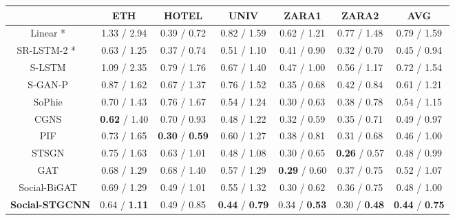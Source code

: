 \documentclass[10pt,twocolumn,letterpaper]{article}
\newcommand*{\ours}{Social-STGCNN }
\begin{document}
\begin{table*}[ht]
\centering
\begin{tabular}{c||c|c|c|c|c|c}
&  ETH & HOTEL & UNIV & ZARA1 & ZARA2 & AVG\\\hline
\midrule
Linear *~\cite{alahi2016social}  & 1.33 / 2.94 & 0.39 / 0.72 & 0.82 / 1.59 & 0.62 / 1.21 & 0.77 / 1.48 & 0.79 / 1.59\\\hline
SR-LSTM-2 * ~\cite{zhang2019sr}  & 0.63 / 1.25 & 0.37 / 0.74 & 0.51 / 1.10 & 0.41 / 0.90 & 0.32 / 0.70 & 0.45 / 0.94\\\hline
S-LSTM~\cite{alahi2016social}  & 1.09 / 2.35 & 0.79 / 1.76 & 0.67 / 1.40 & 0.47 / 1.00 & 0.56 / 1.17 & 0.72 / 1.54\\\hline
S-GAN-P~\cite{gupta2018social}  & 0.87 / 1.62 & 0.67 / 1.37 & 0.76 / 1.52 & 0.35 / 0.68 & 0.42 / 0.84 & 0.61 / 1.21\\\hline
SoPhie~\cite{sadeghian2019sophie}  & 0.70 / 1.43 & 0.76 / 1.67 & 0.54 / 1.24 & 0.30 / 0.63 & 0.38 / 0.78 & 0.54 / 1.15\\\hline
CGNS~\cite{li2019conditional}  & \textbf{0.62} / 1.40 & 0.70 / 0.93 & 0.48 / 1.22 & 0.32 / 0.59 & 0.35 / 0.71 & 0.49 / 0.97\\\hline
PIF~\cite{liang2019peeking} & 0.73 / 1.65 & \textbf{0.30} / \textbf{0.59} & 0.60 / 1.27 & 0.38 / 0.81 & 0.31 / 0.68 & 0.46 / 1.00\\\hline
STSGN~\cite{zhang2019stochastic}  & 0.75 / 1.63 & 0.63 / 1.01 & 0.48 / 1.08 & 0.30 / 0.65 & \textbf{0.26} / 0.57 & 0.48 / 0.99\\\hline
GAT~\cite{kosaraju2019social} & 0.68 / 1.29 & 0.68 / 1.40 & 0.57 / 1.29 &\textbf{ 0.29} / 0.60 & 0.37 / 0.75 & 0.52 / 1.07\\\hline
Social-BiGAT~\cite{kosaraju2019social} & 0.69 / 1.29 & 0.49 / 1.01 & 0.55 / 1.32 & 0.30 / 0.62 & 0.36 / 0.75 & 0.48 / 1.00\\\hline

\midrule
\textbf{\ours} &0.64 / \textbf{1.11} &0.49 / 0.85 &\textbf{0.44} / \textbf{0.79} & 0.34 / \textbf{0.53} &0.30 / \textbf{0.48} &\textbf{ \textbf{0.44}} / \textbf{0.75}\\\hline

\end{tabular}
\caption{ADE / FDE metrics for several methods compared to \ours are shown. The models with * mark are non-probabilistic. The rest of models used the best amongst 20 samples for evaluation. All models takes as an input 8 frames and predicts the next 12 frames. We notice that \ours have the best average error on both ADE and FDE metrics. The lower the better.}
\label{tb:results}

\end{table*}
\end{document}
